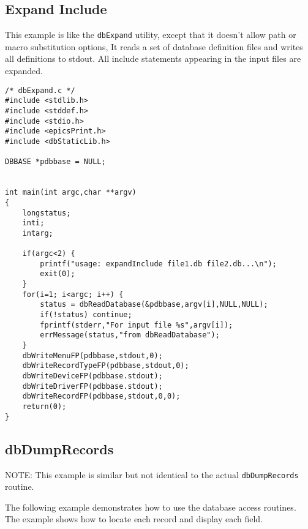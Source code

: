 \subsection{Expand Include}

This example is like the \verb|dbExpand| utility, except that it doesn't allow path or macro substitution options, It reads a set of 
database definition files and writes all definitions to stdout. All include statements appearing in the input files are 
expanded.

\begin{verbatim}
/* dbExpand.c */
#include <stdlib.h>
#include <stddef.h>
#include <stdio.h>
#include <epicsPrint.h>
#include <dbStaticLib.h>

DBBASE *pdbbase = NULL;


int main(int argc,char **argv)
{
    longstatus;
    inti;
    intarg;
 
    if(argc<2) {
        printf("usage: expandInclude file1.db file2.db...\n");
        exit(0);
    }
    for(i=1; i<argc; i++) {
        status = dbReadDatabase(&pdbbase,argv[i],NULL,NULL);
        if(!status) continue;
        fprintf(stderr,"For input file %s",argv[i]);
        errMessage(status,"from dbReadDatabase");
    }
    dbWriteMenuFP(pdbbase,stdout,0);
    dbWriteRecordTypeFP(pdbbase,stdout,0);
    dbWriteDeviceFP(pdbbase.stdout);
    dbWriteDriverFP(pdbbase.stdout);
    dbWriteRecordFP(pdbbase,stdout,0,0);
    return(0);
}

\end{verbatim}

\subsection{dbDumpRecords}

NOTE: This example is similar but not identical to the actual \verb|dbDumpRecords| routine.

The following example demonstrates how to use the database access routines. The example shows how to locate each 
record and display each field.

